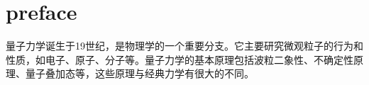\chapter{preface}
量子力学诞生于19世纪，是物理学的一个重要分支。它主要研究微观粒子的行为和性质，如电子、原子、分子等。量子力学的基本原理包括波粒二象性、不确定性原理、量子叠加态等，这些原理与经典力学有很大的不同。

